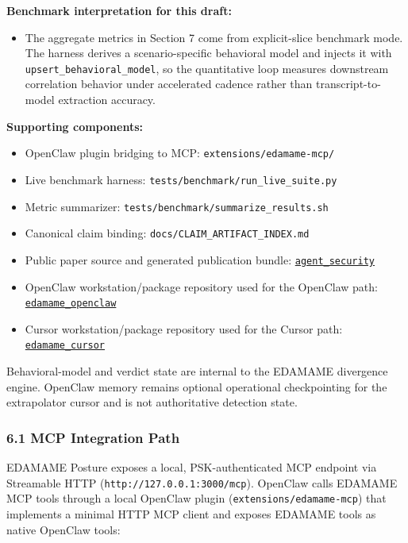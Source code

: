 \documentclass[
]{article}
\providecommand{\tightlist}{%
  \setlength{\itemsep}{0pt}\setlength{\parskip}{0pt}}
\begin{document}
\textbf{Benchmark interpretation for this draft:}

\begin{itemize}
\tightlist
\item
  The aggregate metrics in Section 7 come from explicit-slice benchmark
  mode. The harness derives a scenario-specific behavioral model and
  injects it with \texttt{upsert\_behavioral\_model}, so the
  quantitative loop measures downstream correlation behavior under
  accelerated cadence rather than transcript-to-model extraction
  accuracy.
\end{itemize}

\textbf{Supporting components:}

\begin{itemize}
\tightlist
\item
  OpenClaw plugin bridging to MCP: \texttt{extensions/edamame-mcp/}
\item
  Live benchmark harness: \texttt{tests/benchmark/run\_live\_suite.py}
\item
  Metric summarizer: \texttt{tests/benchmark/summarize\_results.sh}
\item
  Canonical claim binding: \texttt{docs/CLAIM\_ARTIFACT\_INDEX.md}
\item
  Public paper source and generated publication bundle:
  \href{https://github.com/edamametechnologies/agent_security}{\texttt{agent\_security}}
\item
  OpenClaw workstation/package repository used for the OpenClaw path:
  \href{https://github.com/edamametechnologies/edamame_openclaw}{\texttt{edamame\_openclaw}}
\item
  Cursor workstation/package repository used for the Cursor path:
  \href{https://github.com/edamametechnologies/edamame_cursor}{\texttt{edamame\_cursor}}
\end{itemize}

Behavioral-model and verdict state are internal to the EDAMAME
divergence engine. OpenClaw memory remains optional operational
checkpointing for the extrapolator cursor and is not authoritative
detection state.

\subsubsection{6.1 MCP Integration Path}\label{mcp-integration-path}

EDAMAME Posture exposes a local, PSK-authenticated MCP endpoint via
Streamable HTTP (\texttt{http://127.0.0.1:3000/mcp}). OpenClaw calls
EDAMAME MCP tools through a local OpenClaw plugin
(\texttt{extensions/edamame-mcp}) that implements a minimal HTTP MCP
client and exposes EDAMAME tools as native OpenClaw tools:
\end{document}
